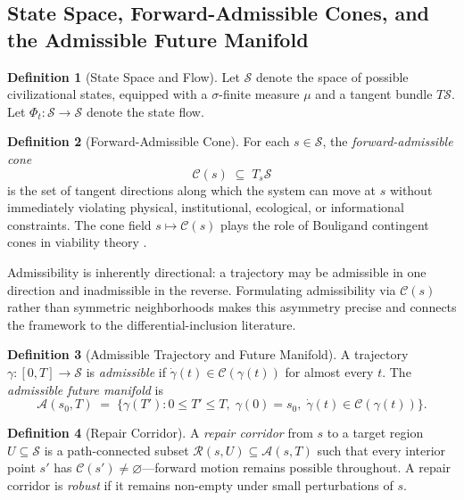 \documentclass[12pt, a4paper]{article}
\theoremstyle{plain}
\theoremstyle{definition}
\newtheorem{definition}{Definition}
\theoremstyle{remark}
\begin{document}
\subsection{State Space, Forward-Admissible Cones, and the Admissible Future Manifold}

\begin{definition}[State Space and Flow]
Let $\mathcal{S}$ denote the space of possible civilizational states, equipped with a $\sigma$-finite measure $\mu$ and a tangent bundle $T\mathcal{S}$. Let $\Phi_t : \mathcal{S} \to \mathcal{S}$ denote the state flow.
\end{definition}

\begin{definition}[Forward-Admissible Cone]
For each $s \in \mathcal{S}$, the \emph{forward-admissible cone}
\[
\mathcal{C}(s) \;\subseteq\; T_s\mathcal{S}
\]
is the set of tangent directions along which the system can move at $s$ without immediately violating physical, institutional, ecological, or informational constraints. The cone field $s \mapsto \mathcal{C}(s)$ plays the role of Bouligand contingent cones in viability theory \cite{aubin1991}.
\end{definition}

Admissibility is inherently directional: a trajectory may be admissible in one direction and inadmissible in the reverse. Formulating admissibility via $\mathcal{C}(s)$ rather than symmetric neighborhoods makes this asymmetry precise and connects the framework to the differential-inclusion literature.

\begin{definition}[Admissible Trajectory and Future Manifold]
A trajectory $\gamma : [0,T] \to \mathcal{S}$ is \emph{admissible} if $\dot{\gamma}(t) \in \mathcal{C}(\gamma(t))$ for almost every $t$. The \emph{admissible future manifold} is
\[
\mathcal{A}(s_0, T) \;=\; \bigl\{ \gamma(T') : 0 \leq T' \leq T,\; \gamma(0) = s_0,\; \dot{\gamma}(t) \in \mathcal{C}(\gamma(t)) \bigr\}.
\]
\end{definition}

\begin{definition}[Repair Corridor]
A \emph{repair corridor} from $s$ to a target region $U \subseteq \mathcal{S}$ is a path-connected subset $\mathcal{R}(s,U) \subseteq \mathcal{A}(s,T)$ such that every interior point $s'$ has $\mathcal{C}(s') \neq \varnothing$---forward motion remains possible throughout. A repair corridor is \emph{robust} if it remains non-empty under small perturbations of $s$.
\end{definition}
\end{document}
